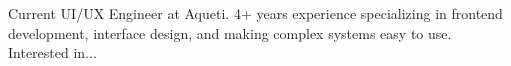 

\begin{cvparagraph}

Current UI/UX Engineer at Aqueti. 4+ years experience specializing in frontend development, interface design, and making complex systems easy to use. Interested in...
\end{cvparagraph}
